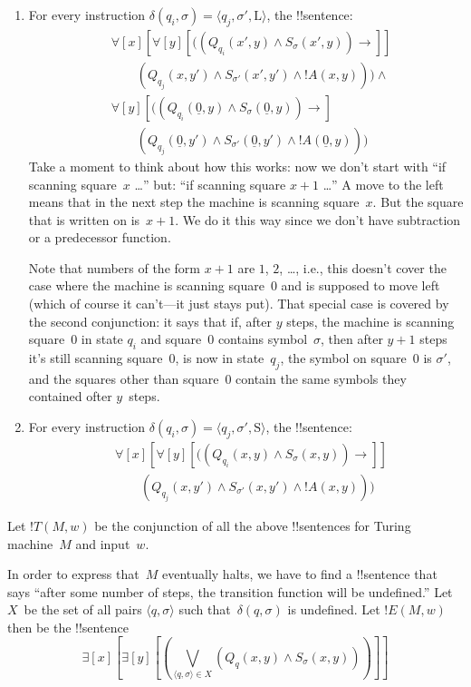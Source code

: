 \documentclass[10pt,a4paper]{article}
\theoremstyle{plain}
\theoremstyle{definition}
\theoremstyle{remark}
\newcommand*{\ollabel}[1]{\label{#1}}
\providecommand{\lif}{\mathbin{\rightarrow}}
\providecommand{\lforall}{\mathord{\forall}}
\providecommand{\lexists}{\mathord{\exists}}
\providecommand{\Obj}{}
\providecommand{\tuple}[1]{\langle #1 \rangle}
\providecommand{\num}[1]{\underline{#1}}
\providecommand{\TMstay}{\mathrm{S}}
\providecommand{\TMleft}{\mathrm{L}}
\begin{document}
\begin{enumerate}
\begin{enumerate}
\item \ollabel{rep-left} For every instruction $\delta(q_i, \sigma) =
  \tuple{q_j, \sigma', \TMleft}$, the !!{sentence}:
\begin{align*}
& \lforall[x][\lforall[y][
    ((\Obj Q_{q_i}(x', y) \land \Obj S_{\sigma}(x', y)) \lif {}]]\\
& \qquad   (\Obj Q_{q_j}(x, y') \land \Obj S_{\sigma'}(x', y') \land
!A(x, y))) \land {}\\
& \lforall[y][((\Obj Q_{q_i}(\num{0}, y) \land \Obj S_{\sigma}(\num{0},
    y)) \lif {}]\\
& \qquad (\Obj Q_{q_j}(\num{0}, y') \land \Obj S_{\sigma'}(\num{0},
  y') \land !A(\num{0}, y)))
\end{align*}
Take a moment to think about how this works: now we don't start with
``if scanning square~$x$ \dots'' but: ``if scanning square $x+1$
\dots'' A move to the left means that in the next step the machine is
scanning square~$x$.  But the square that is written on is~$x+1$.  We
do it this way since we don't have subtraction or a predecessor
function.

Note that numbers of the form $x+1$ are $1$, $2$, \dots, i.e., this
doesn't cover the case where the machine is scanning square~$0$ and is
supposed to move left (which of course it can't---it just stays
put). That special case is covered by the second conjunction: it says
that if, after $y$ steps, the machine is scanning square~$0$ in state
$q_i$ and square~$0$ contains symbol~$\sigma$, then after $y+1$ steps
it's still scanning square~$0$, is now in state~$q_j$, the symbol on
square~$0$ is $\sigma'$, and the squares other than square~$0$ contain
the same symbols they contained ofter $y$~steps.
\item \ollabel{rep-stay} For every instruction $\delta(q_i, \sigma) =
  \tuple{q_j, \sigma', \TMstay}$, the !!{sentence}:
\begin{align*}
& \lforall[x][\lforall[y][(
   (\Obj Q_{q_i}(x, y) \land \Obj S_{\sigma}(x, y)) \lif {}]] \\
&\qquad   (\Obj Q_{q_j}(x, y') \land \Obj S_{\sigma'}(x, y') \land
!A(x, y)))
\end{align*}
\end{enumerate}
\end{enumerate}
Let $!T(M, w)$ be the conjunction of all the above !!{sentence}s for Turing
machine~$M$ and input~$w$.

In order to express that~$M$ eventually halts, we have to find a
!!{sentence} that says ``after some number of steps, the transition
function will be undefined.''  Let $X$~be the set of all pairs
$\tuple{q, \sigma}$ such that~$\delta(q, \sigma)$ is undefined.  Let
$!E(M, w)$ then be the !!{sentence}
\[
\lexists[x][\lexists[y][(\bigvee_{\tuple{q, \sigma} \in
      X}(\Obj Q_q(x, y) \land \Obj S_\sigma(x, y)))]]
\]
\end{document}

